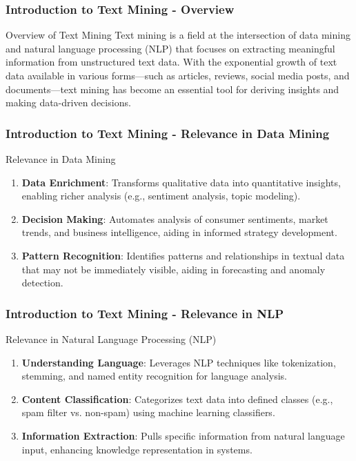 \documentclass[aspectratio=169]{beamer}
\begin{document}
\frame{\titlepage}

\begin{frame}[fragile]
    \frametitle{Introduction to Text Mining - Overview}
    \begin{block}{Overview of Text Mining}
        Text mining is a field at the intersection of data mining and natural language processing (NLP) that focuses on extracting meaningful information from unstructured text data. With the exponential growth of text data available in various forms—such as articles, reviews, social media posts, and documents—text mining has become an essential tool for deriving insights and making data-driven decisions.
    \end{block}
\end{frame}

\begin{frame}[fragile]
    \frametitle{Introduction to Text Mining - Relevance in Data Mining}
    \begin{block}{Relevance in Data Mining}
        \begin{enumerate}
            \item \textbf{Data Enrichment}: Transforms qualitative data into quantitative insights, enabling richer analysis (e.g., sentiment analysis, topic modeling).
            \item \textbf{Decision Making}: Automates analysis of consumer sentiments, market trends, and business intelligence, aiding in informed strategy development.
            \item \textbf{Pattern Recognition}: Identifies patterns and relationships in textual data that may not be immediately visible, aiding in forecasting and anomaly detection.
        \end{enumerate}
    \end{block}
\end{frame}

\begin{frame}[fragile]
    \frametitle{Introduction to Text Mining - Relevance in NLP}
    \begin{block}{Relevance in Natural Language Processing (NLP)}
        \begin{enumerate}
            \item \textbf{Understanding Language}: Leverages NLP techniques like tokenization, stemming, and named entity recognition for language analysis.
            \item \textbf{Content Classification}: Categorizes text data into defined classes (e.g., spam filter vs. non-spam) using machine learning classifiers.
            \item \textbf{Information Extraction}: Pulls specific information from natural language input, enhancing knowledge representation in systems.
        \end{enumerate}
    \end{block}
\end{frame}
\end{document}
